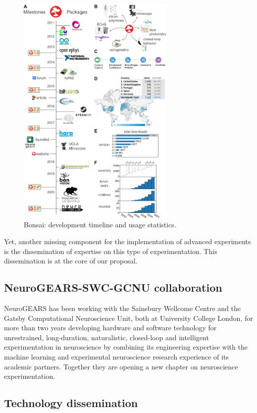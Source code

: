 \begin{figure}
	\begin{center}
		\includegraphics[width=3in]{figures/roadmap-bbsrc-3x.pdf}
	\end{center}
	\caption{Bonsai: development timeline and usage statistics.}
	\label{fig:bonsai}
\end{figure}

Yet, another missing component for the implementation of advanced experiments is the
dissemination of expertise on this type of experimentation. This dissemination
is at the core of our proposal.

\subsection{NeuroGEARS-SWC-GCNU collaboration}

NeuroGEARS has been working with the Sainsbury Wellcome Centre and the Gatsby
Computational Neuroscience Unit, both at University College London, for more
than two years developing hardware and software technology for unrestrained,
long-duration, naturalistic, closed-loop and intelligent experimentation in
neuroscience by combining its engineering expertise with the machine learning
and experimental neuroscience research experience of its academic partners.
Together they are opening a new chapter on neuroscience experimentation.

\subsection{Technology dissemination}

